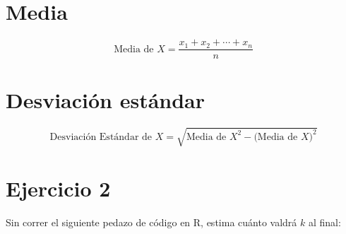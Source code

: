 \documentclass[
]{book}
\begin{document}
\hypertarget{media}{%
\section{Media}\label{media}}

\[
\begin{equation}
\textrm{Media de }X = \frac{x_1 + x_2 + \cdots + x_n}{n} 
\end{equation}
\]

\hypertarget{desviaciuxf3n-estuxe1ndar}{%
\section{Desviación estándar}\label{desviaciuxf3n-estuxe1ndar}}

\[
\begin{equation}
\textrm{Desviación Estándar de }X = \sqrt{\textrm{Media de }X^2 - \Big(\textrm{Media de }X\Big)^2} 
\end{equation}
\]

\hypertarget{ejercicio-2-1}{%
\section{Ejercicio 2}\label{ejercicio-2-1}}

Sin correr el siguiente pedazo de código en R, estima cuánto valdrá \(k\) al final:
\end{document}
